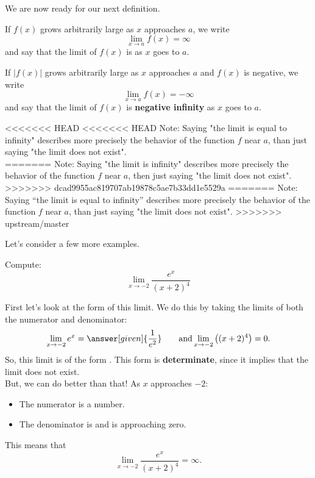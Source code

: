 \documentclass{ximera}
\begin{document}
We are now ready for our next definition.

\begin{definition}
If $f(x)$ grows arbitrarily large as $x$ approaches $a$, we write
\[
\lim_{x\to a} f(x) = \infty
\]
and say that the limit of $f(x)$ is   as $x$
goes to $a$.


If $|f(x)|$ grows arbitrarily large as $x$ approaches $a$ and $f(x)$ is
negative, we write
\[
\lim_{x\to a} f(x) = -\infty
\]
and say that the limit of $f(x)$ is  \textbf{ negative infinity}
as $x$ goes to $a$.

\end{definition}

<<<<<<< HEAD
<<<<<<< HEAD
Note: Saying "the limit is equal to infinity"  describes more precisely the behavior of the function $f$ near $a$, than just saying "the limit does not exist".\\
=======
Note: Saying "the limit is  infinity"  describes more precisely the behavior of the function $f$ near $a$, then just saying "the limit does not exist".\\
>>>>>>> dcad9955ac819707ab19878c5ae7b33dd1e5529a
=======
Note: Saying ``the limit is equal to infinity''  describes more precisely the behavior of the function $f$ near $a$, than just saying "the limit does not exist".
>>>>>>> upstream/master

Let's consider a few more examples.

\begin{example}
  Compute:
  \[
  \lim_{x\to -2} \frac{e^x}{(x+2)^4}
  \]
  \begin{explanation}
    First let's look at the form of this limit. We do this by taking the limits of both the numerator and denominator:
    \[
    \lim_{x\to -2} e^x = \answer[given]{\frac{1}{e^2}}\qquad\text{and}\lim_{x\to-2}\left((x+2)^4\right) = 0.
    \]
    So, this limit is of the form \numOverZero. This form is \textbf{determinate}, since it implies that  the limit does not exist.\\
    But, we can do better than that!
     As $x$ approaches $-2$:
    \begin{itemize}
    \item The numerator is a  number. 
    \item The denominator is  and is approaching zero.
    \end{itemize}
    This means that 
    \[
    \lim_{x\to -2} \frac{e^x}{(x+2)^4} = \infty.
    \]
  
  \end{explanation}
\end{example}
\end{document}
